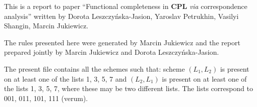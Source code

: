 \documentclass[11pt]{article}
\begin{document}
	
	This is a report to paper ``Functional completeness in \textbf{CPL} \textit{via} correspondence analysis'' written by Dorota Leszczy\'{n}ska-Jasion, 
	Yaroslav Petrukhin, Vasilyi Shangin, Marcin Jukiewicz. 
	
	The rules presented here were generated by Marcin Jukiewicz and the report prepared jointly by Marcin Jukiewicz and Dorota Leszczy\'{n}ska-Jasion.
	
	The present file contains all the schemes such that: scheme $(L_1, L_2)$ is present on at least one of the lists 1, 3, 5, 7 and $(L_2, L_1)$ is present on at least one of the lists 1, 3, 5, 7, where these may be two different lists. The lists correspond to 001, 011, 101, 111 (verum).
	
	\bigskip

\begin{center}


\end{center}
\end{document}
